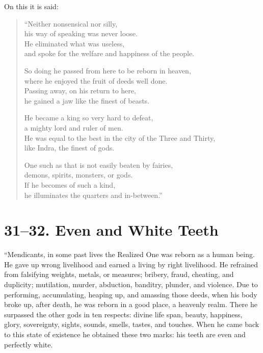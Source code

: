 \documentclass[12pt,openany]{book}%
\begin{document}
On this it is said: 

\begin{verse}%
“Neither nonsensical nor silly, \\
his way of speaking was never loose. \\
He eliminated what was useless, \\
and spoke for the welfare and happiness of the people. 

So doing he passed from here to be reborn in heaven, \\
where he enjoyed the fruit of deeds well done. \\
Passing away, on his return to here, \\
he gained a jaw like the finest of beasts. 

He became a king so very hard to defeat, \\
a mighty lord and ruler of men. \\
He was equal to the best in the city of the Three and Thirty, \\
like Indra, the finest of gods. 

One such as that is not easily beaten by fairies, \\
demons, spirits, monsters, or gods. \\
If he becomes of such a kind, \\
he illuminates the quarters and in-between.” 

%
\end{verse}

\section*{31–32. Even and White Teeth }

“Mendicants, in some past lives the Realized One was reborn as a human being. He gave up wrong livelihood and earned a living by right livelihood. He refrained from falsifying weights, metals, or measures; bribery, fraud, cheating, and duplicity; mutilation, murder, abduction, banditry, plunder, and violence. Due to performing, accumulating, heaping up, and amassing those deeds, when his body broke up, after death, he was reborn in a good place, a heavenly realm. There he surpassed the other gods in ten respects: divine life span, beauty, happiness, glory, sovereignty, sights, sounds, smells, tastes, and touches. When he came back to this state of existence he obtained these two marks: his teeth are even and perfectly white. 
\end{document}
